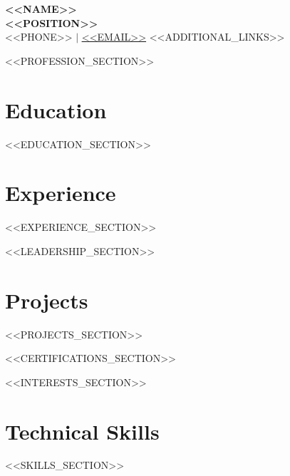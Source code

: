 \documentclass[11pt,a4paper]{article}
\newcommand{\resumeSubHeadingListStart}{\begin{itemize}[leftmargin=0.15in, label={}]}
\newcommand{\resumeSubHeadingListEnd}{\end{itemize}}
\begin{document}
\begin{center}
    \textbf{\Huge \scshape <<NAME>>} \\ \vspace{1pt}
    \textbf{\large \scshape <<POSITION>>} \\ \vspace{1pt}
    \small <<PHONE>> $|$ \href{mailto:<<EMAIL>>}{\underline{<<EMAIL>>}}
    <<ADDITIONAL_LINKS>>
\end{center}

<<PROFESSION_SECTION>>

\section{Education}
  \resumeSubHeadingListStart
    <<EDUCATION_SECTION>>
  \resumeSubHeadingListEnd

\section{Experience}
  \resumeSubHeadingListStart
    <<EXPERIENCE_SECTION>>
  \resumeSubHeadingListEnd

<<LEADERSHIP_SECTION>>

\section{Projects}
\resumeSubHeadingListStart
<<PROJECTS_SECTION>>
\resumeSubHeadingListEnd

<<CERTIFICATIONS_SECTION>>

<<INTERESTS_SECTION>>

\section{Technical Skills}
 \begin{itemize}[leftmargin=0.15in, label={}]
    \small{\item{
     <<SKILLS_SECTION>>
    }}
 \end{itemize}

\end{document}
